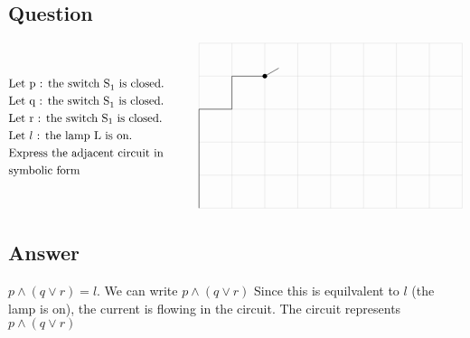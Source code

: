 \documentclass[17pt]{extarticle}
\begin{document}
\begin{fleqn}
\section{Question}

\begin{equation} \nonumber
\begin{alignedat}{4}
& \text{Let p : the switch S}_1 \text{ is closed.} \\
& \text{Let q : the switch S}_1 \text{ is closed.} \\
& \text{Let r : the switch S}_1 \text{ is closed.} \\
& \text{Let }l \text{ : the lamp L is on.}\\
& \text{Express the adjacent circuit in} \\
& \text{symbolic form} \\
\end{alignedat}
\quad\quad\quad
\begin{alignedat}{4}
\begin{tikzpicture}[dot/.style={circle,inner sep=1.4pt,fill}]
\draw[very thin, gray!50, step=1 cm](0,0) grid (8,5);
\draw (0,0) -- (0,3) -- (1,3) -- (1,4) --(2,4);
\node [dot] at (2,4) {};
\draw (2,4) -- +(30:0.49);
\end{tikzpicture}
\end{alignedat}
\end{equation}
\quad
\vspace*{-5mm}


\subsection*{Answer}
$p \wedge (q \vee r) = l$. We can write $p \wedge (q \vee r)$ Since this is equilvalent to $l$ (the lamp is on), the current is flowing in the circuit. The circuit represents $p \wedge (q \vee r)$



\end{fleqn}
\end{document}
